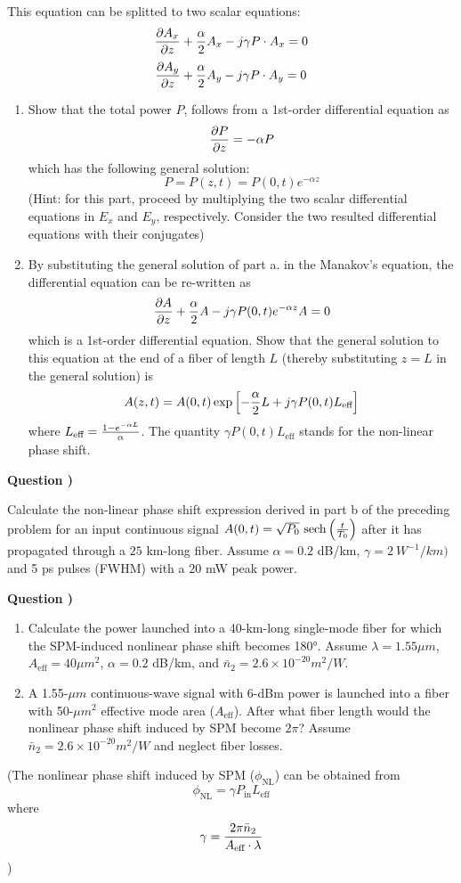\documentclass[10pt,letterpaper]{article}
\newcounter{QuestionNumber}
\newcommand{\Q}{
\textbf{Question \theQuestionNumber)}
\stepcounter{QuestionNumber}
}
\newcommand{\nl}{\newline\newline}
\begin{document}
This equation can be splitted to two scalar equations:
$$
{\partial A_x\over \partial z}+{\alpha\over 2}A_x-j\gamma P\cdot A_x=0
$$
$$
{\partial A_y\over \partial z}+{\alpha\over 2}A_y-j\gamma P\cdot A_y=0
$$
\begin{enumerate}[label=\alph*.]
\item
Show that the total power $P$, follows from a 1st-order differential equation as
$$
{\partial P\over \partial z}=-\alpha P
$$
which has the following general solution:
$$
P=P(z,t)=P(0,t)e^{-\alpha z}
$$
(Hint: for this part, proceed  by multiplying the two scalar differential equations in $E_x$ and $E_y$, respectively. Consider the two resulted differential equations with their conjugates)
\item
By substituting the general solution of part a. in the Manakov's equation, the differential equation can be re-written as
$$
{\partial A\over \partial z}+{\alpha\over 2}A-j\gamma P(0,t)e^{-\alpha z} A=0
$$
which is a 1st-order differential equation. Show that the general solution to this equation at the end of a fiber of length $L$ (thereby substituting $z=L$ in the general solution) is
$$
A(z,t)=A(0,t)\exp\left[-{\alpha\over 2}L+j\gamma P(0,t)L_{\text{eff}}\right]
$$
where $L_{\text{eff}}={1-e^{-\alpha L}\over \alpha}$. The quantity $\gamma P(0,t)L_{\text{eff}}$ stands for the non-linear phase shift.
\end{enumerate}
\Q
Calculate the non-linear phase shift expression derived in part b of the preceding problem for an input continuous signal $A(0,t)=\sqrt{P_0}\ \text{sech}\left({t\over T_0}\right)$ after it has propagated through a $25$ km-long fiber. Assume $\alpha=0.2$ dB/km, $\gamma=2 \  W^{-1}/km)$ and 5 ps pulses (FWHM) with a $20$ mW peak power.
\nl
\Q

\begin{enumerate}[label=\alph*.]
\item
Calculate the power launched into a 40-km-long single-mode fiber for which
the SPM-induced nonlinear phase shift becomes 180°. Assume $\lambda=1.55\mu m$,
$A_\text{eff} = 40 \mu m^2$, $\alpha = 0.2$ dB/km, and $\bar n_2 = 2.6 \times 10^{-20} m^2/W$.
\item
A 1.55-$\mu m$ continuous-wave signal with 6-dBm power is launched into a fiber with 50-$\mu m^2$ effective mode area ($A_\text{eff}$). After what fiber length would the nonlinear phase shift induced by SPM become $2\pi$? Assume $\bar n_2= 2.6 \times 10^{-20} m^2/W$ and neglect fiber losses.
\end{enumerate}

(The nonlinear phase shift induced by SPM ($\phi_\text{NL}$) can be obtained from
$$
\phi_\text{NL}=\gamma P_\text{in}L_\text{eff}
$$
where
$$
\gamma={2\pi \bar n_2\over A_\text{eff}\cdot \lambda}
$$
)
\end{document}
